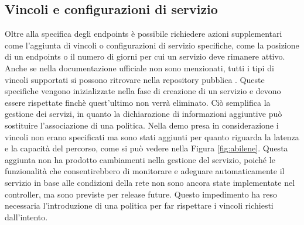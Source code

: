 \subsection{Vincoli e configurazioni di servizio}
Oltre alla specifica degli endpoints è possibile richiedere azioni supplementari come l'aggiunta di vincoli o configurazioni di servizio specifiche, 
come la posizione di un endpoints o il numero di giorni per cui un servizio deve rimanere attivo. 
Anche se nella documentazione ufficiale non sono menzionati, tutti i tipi di vincoli supportati 
si possono ritrovare nella repository pubblica \cite{vincoli}.
\newline Queste specifiche vengono inizializzate nella fase di creazione di un servizio e devono essere rispettate finchè quest'ultimo non verrà eliminato. 
Ciò semplifica la gestione dei servizi, in quanto la dichiarazione di informazioni aggiuntive può sostituire l'associazione di una politica.
\newline Nella demo presa in considerazione i vincoli non erano specificati ma sono stati aggiunti per quanto riguarda la latenza e la capacità del percorso, 
come si può vedere nella Figura \ref{fig:abilene}.
Questa aggiunta non ha prodotto cambiamenti nella gestione del servizio,
poiché le funzionalità che consentirebbero di monitorare e adeguare automaticamente il servizio 
in base alle condizioni della rete non sono ancora state implementate nel controller, ma sono previste per release future.
Questo impedimento ha reso necessaria l'introduzione di una politica per far rispettare i vincoli richiesti dall'intento.
